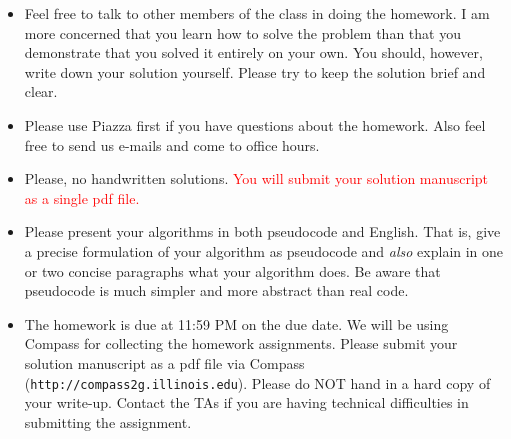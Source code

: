 
\usepackage{graphicx,amssymb,amsmath,url}
\usepackage{xcolor}
\sloppy
\newcommand{\ignore}[1]{}
\newcommand{\bx}{{\bf x}}
\newcommand{\bw}{{\bf w}}
\usepackage{float}

\oddsidemargin 0in
\evensidemargin 0in
\textwidth 6.5in
\topmargin -0.5in
\textheight 9.0in

\newcommand{\bb}[1]{{\bf #1}}





\begin{footnotesize}
\begin{itemize}
\item Feel free to talk to other members of the class in doing the homework.  I am
more concerned that you learn how to solve the problem than that you
demonstrate that you solved it entirely on your own.  You should, however,
write down your solution yourself.  Please try to keep the solution brief and
clear.

\item Please use Piazza first if you have questions about the homework.
  Also feel free to send us e-mails and come to office hours.

\item Please, no handwritten solutions. \textcolor{red}{You will submit your solution manuscript as a single pdf file.}

\item Please present your algorithms in both pseudocode and English.  That is, give
a precise formulation of your algorithm as pseudocode and {\em also} explain
in one or two concise paragraphs what your algorithm does.  Be aware that
pseudocode is much simpler and more abstract than real code. 

\item The homework is due at 11:59 PM on the due date. We will be using
Compass for collecting the homework assignments. Please submit your solution manuscript as a pdf file via Compass
(\texttt{http://compass2g.illinois.edu}). Please do NOT hand in a hard copy of your write-up.
Contact the TAs if you are having technical difficulties in
submitting the assignment.

\end{itemize}
\end{footnotesize}
